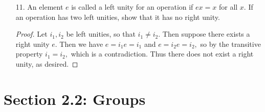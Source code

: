 \documentclass{article}
\begin{document}
\begin{itemize}
\begin{proof}
		\end{proof}

	\item[11.] An element $e$ is called a left unity for an operation if $ex=x$ for all $x.$ If an operation has two left unities, show that it has no right unity.
		\begin{proof}
			Let $i_1, i_2$ be left unities, so that $i_1\neq i_2.$ Then suppose there exists a right unity $e.$ Then we have $e=i_1e=i_1$ and $e=i_2e=i_2,$ so by the transitive property $i_1=i_2,$ which is a contradiction. Thus there does not exist a right unity, as desired.
			
		\end{proof}
		
\end{itemize}

\section*{Section 2.2: Groups}
\end{document}
